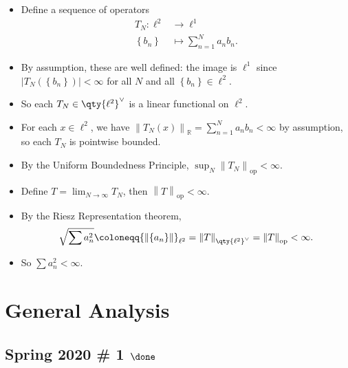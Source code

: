
\begin{solution}

\envlist

\begin{itemize}
\item
  Define a sequence of operators
  \begin{align*}  
  T_N: \ell^2 &\to \ell^1\\
  \left\{{b_n}\right\} &\mapsto \sum_{n=1}^N a_n b_n
  .\end{align*}
\item
  By assumption, these are well defined: the image is \(\ell^1\) since
  \({\left\lvert {T_N(\left\{{b_n}\right\})} \right\rvert} < \infty\)
  for all \(N\) and all \(\left\{{b_n}\right\} \in \ell^2\).
\item
  So each \(T_N \in \qty{\ell^2}^\vee\) is a linear functional on
  \(\ell^2\).
\item
  For each \(x\in \ell^2\), we have
  \({\left\lVert {T_N(x)} \right\rVert}_{{\mathbb{R}}} = \sum_{n=1}^N a_n b_n < \infty\)
  by assumption, so each \(T_N\) is pointwise bounded.
\item
  By the Uniform Boundedness Principle,
  \(\sup_N {\left\lVert {T_N} \right\rVert}_{\text{op}} < \infty\).
\item
  Define \(T = \lim_{N \to\infty } T_N\), then
  \({\left\lVert {T} \right\rVert}_{\text{op}} < \infty\).
\item
  By the Riesz Representation theorem,
  \begin{align*}  
  \sqrt{\sum a_n^2} \coloneqq{\left\lVert {\left\{{a_n}\right\}} \right\rVert}_{\ell^2} = {\left\lVert {T} \right\rVert}_{\qty{\ell^2}^\vee} = {\left\lVert {T} \right\rVert}_{\text{op}} < \infty
  .\end{align*}
\item
  So \(\sum a_n^2 < \infty\).
\end{itemize}

\end{solution}

\hypertarget{general-analysis}{%
\section{General Analysis}\label{general-analysis}}

\hypertarget{spring-2020-1-done}{%
\subsection{\texorpdfstring{Spring 2020 \# 1
\(\done\)}{Spring 2020 \# 1 \textbackslash done}}\label{spring-2020-1-done}}

